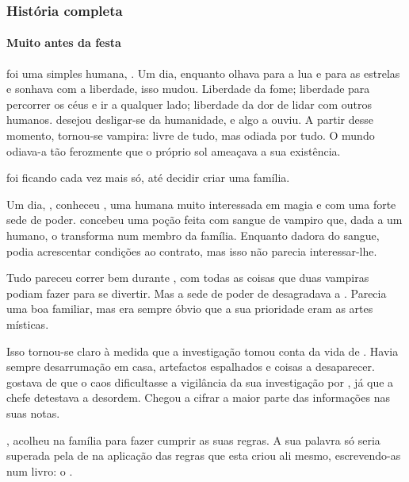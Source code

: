 \subsubsection{História completa}

\paragraph{Muito antes da festa}

 foi uma simples humana, . Um dia, enquanto olhava para a lua e para as estrelas e sonhava com a liberdade, isso mudou. Liberdade da fome; liberdade para percorrer os céus e ir a qualquer lado; liberdade da dor de lidar com outros humanos.  desejou desligar-se da humanidade, e algo a ouviu. A partir desse momento, tornou-se vampira: livre de tudo, mas odiada por tudo. O mundo odiava-a tão ferozmente que o próprio sol ameaçava a sua existência.

 foi ficando cada vez mais só, até decidir criar uma família.

Um dia, ,  conheceu , uma humana muito interessada em magia e com uma forte sede de poder.  concebeu uma poção feita com sangue de vampiro que, dada a um humano, o transforma num membro da família. Enquanto dadora do sangue,  podia acrescentar condições ao contrato, mas isso não parecia interessar-lhe.

Tudo pareceu correr bem durante , com todas as coisas que duas vampiras podiam fazer para se divertir. Mas a sede de poder de  desagradava a . Parecia uma boa familiar, mas era sempre óbvio que a sua prioridade eram as artes místicas.

Isso tornou-se claro à medida que a investigação tomou conta da vida de . Havia sempre desarrumação em casa, artefactos espalhados e coisas a desaparecer.  gostava de que o caos dificultasse a vigilância da sua investigação por , já que a chefe detestava a desordem. Chegou a cifrar a maior parte das informações nas suas notas.

,  acolheu  na família para fazer cumprir as suas regras. A sua palavra só seria superada pela de  na aplicação das regras que esta criou ali mesmo, escrevendo-as num livro: o .

